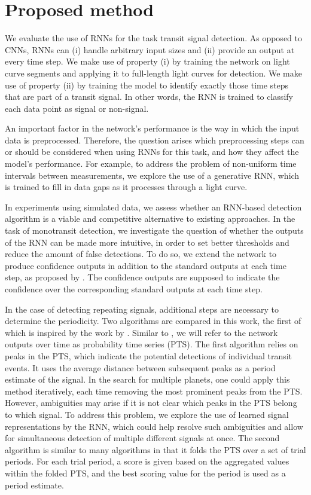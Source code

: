 
\section{Proposed method}
\label{sec:proposed}

We evaluate the use of RNNs for the task transit signal detection. As opposed to CNNs, RNNs can (i) handle arbitrary input sizes and (ii) provide an output at every time step. We make use of property (i) by training the network on light curve segments and applying it to full-length light curves for detection. We make use of property (ii) by training the model to identify exactly those time steps that are part of a transit signal. In other words, the RNN is trained to classify each data point as signal or non-signal.

An important factor in the network's performance is the way in which the input data is preprocessed. Therefore, the question arises which preprocessing steps can or should be considered when using RNNs for this task, and how they affect the model’s performance. For example, to address the problem of non-uniform time intervals between measurements, we explore the use of a generative RNN, which is trained to fill in data gaps as it processes through a light curve. 

In experiments using simulated data, we assess whether an RNN-based detection algorithm is a viable and competitive alternative to existing approaches. In the task of monotransit detection, we investigate the question of whether the outputs of the RNN can be made more intuitive, in order to set better thresholds and reduce the amount of false detections. To do so, we extend the network to produce confidence outputs in addition to the standard outputs at each time step, as proposed by \cite{devries2018learning}. The confidence outputs are supposed to indicate the confidence over the corresponding standard outputs at each time step.

In the case of detecting repeating signals, additional steps are necessary to determine the periodicity. Two algorithms are compared in this work, the first of which is inspired by the work by \cite{pearson2018searching}. Similar to \cite{pearson2018searching}, we will refer to the network outputs over time as probability time series (PTS). The first algorithm relies on peaks in the PTS, which indicate the potential detections of individual transit events. It uses the average distance between subsequent peaks as a period estimate of the signal. In the search for multiple planets, one could apply this method iteratively, each time removing the most prominent peaks from the PTS. However, ambiguities may arise if it is not clear which peaks in the PTS belong to which signal. To address this problem, we explore the use of learned signal representations by the RNN, which could help resolve such ambiguities and allow for simultaneous detection of multiple different signals at once.  The second algorithm is similar to many algorithms in that it folds the PTS over a set of trial periods. For each trial period, a score is given based on the aggregated values within the folded PTS, and the best scoring value for the period is used as a period estimate.

